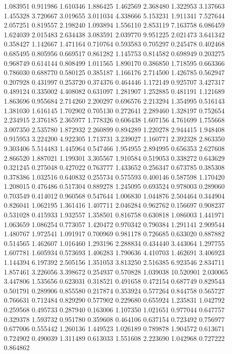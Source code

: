 1.083951
0.911986
1.610346
1.886425
1.462569
2.368480
1.322953
3.137663
1.455328
3.720667
3.019655
3.011034
4.338666
5.153231
1.911341
7.527644
2.057251
0.819557
2.198240
1.093894
1.556110
2.853119
7.163758
6.086459
1.624039
2.015483
2.634438
3.083591
2.039770
9.951225
2.021473
3.641342
0.358427
1.142667
1.471164
0.710764
0.593583
0.705297
0.245478
0.402468
0.685495
0.805956
0.669517
0.861282
1.145753
0.814582
0.698949
0.203275
0.968749
0.614144
0.808499
1.011565
1.890170
0.386850
1.718595
0.663366
0.786030
0.688770
0.580125
0.385187
1.166176
2.714500
1.426785
0.562947
0.207928
0.431997
0.253720
0.374376
0.464446
1.172149
0.925707
3.427317
0.489124
0.335002
4.408082
0.631097
1.281907
1.252885
0.481191
1.121689
1.863696
0.955684
2.714260
2.200297
0.696576
2.213294
1.354995
0.516143
1.381030
1.616145
1.702902
0.705130
0.272641
2.289460
1.328197
0.752654
2.234915
2.376185
2.365977
1.778326
0.606438
1.607156
4.761699
1.755668
3.007350
2.535780
1.872932
2.260899
0.894289
1.220278
2.944415
1.948408
0.915953
3.224200
4.922305
1.713731
3.239027
1.160771
2.392328
2.863350
9.303406
5.514483
1.445964
0.547466
1.954955
2.894995
0.656353
2.627608
2.866520
1.887021
1.199301
3.305567
1.910584
0.519053
0.338272
0.643629
0.321245
0.275048
0.427022
0.763777
1.433652
0.256347
0.673785
0.385308
0.378386
1.032516
0.640832
0.255734
0.575593
0.400146
0.587598
1.170420
1.208015
0.476486
0.517304
0.889278
1.245095
0.693524
0.978003
0.289060
0.703549
0.414012
0.960568
0.547644
1.006830
1.044876
2.504464
0.344904
0.826041
1.062195
1.361416
1.407711
2.046284
0.962762
0.156697
0.908237
0.531028
0.415933
1.932557
1.358501
0.816758
0.630818
1.086003
1.441971
1.063659
1.086254
0.773057
1.420472
0.970342
0.790384
1.291141
2.909544
1.480767
1.972541
1.091917
0.700969
0.981178
0.726685
0.633020
0.887882
0.514565
1.462607
1.016460
1.293196
2.288834
0.434440
3.443064
1.297755
1.607781
1.605934
0.573693
1.406283
1.790636
4.410703
1.462691
3.406923
1.144394
6.197392
2.505156
1.351053
3.813250
2.516385
6.923546
2.834711
1.857461
3.226056
3.398672
0.254937
0.570828
1.039038
10.520901
2.030065
3.447806
1.535656
0.623031
0.318521
0.491658
0.472154
0.687749
0.829543
0.501791
0.289906
0.855580
0.217874
0.353924
0.577264
0.844758
0.565727
0.766631
0.712484
0.829290
0.577902
0.229680
0.655924
1.235831
1.042792
0.259568
0.495733
0.287940
0.163006
1.107350
1.021651
0.977044
0.647757
0.329378
1.593732
0.951780
0.359608
0.464106
0.637154
0.723492
0.756977
0.677006
0.555442
1.260136
1.449523
1.026189
0.789878
1.904572
0.613671
0.724902
0.490039
1.311489
0.613033
1.551608
2.223690
1.042968
0.727222
0.864862
